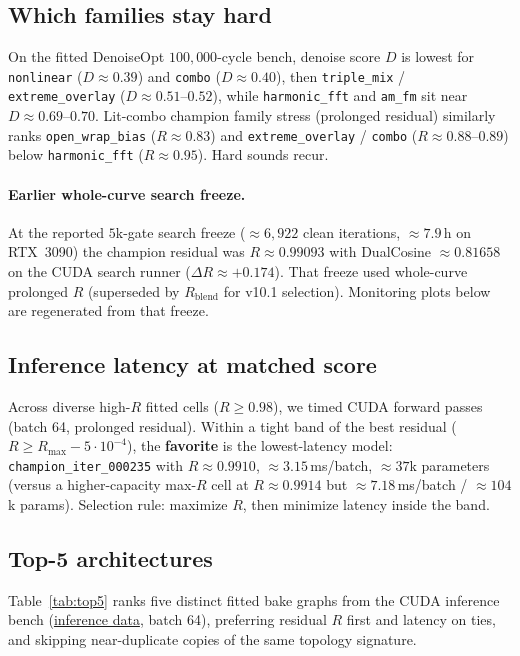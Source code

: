 \subsection{Which families stay hard}
\label{sec:family-hardness}
On the fitted DenoiseOpt $100{,}000$-cycle bench, denoise score $D$ is lowest for \texttt{nonlinear} ($D\approx 0.39$) and \texttt{combo} ($D\approx 0.40$), then \texttt{triple\_mix} / \texttt{extreme\_overlay} ($D\approx 0.51$--$0.52$), while \texttt{harmonic\_fft} and \texttt{am\_fm} sit near $D\approx 0.69$--$0.70$.
Lit-combo champion family stress (prolonged residual) similarly ranks \texttt{open\_wrap\_bias} ($R\approx 0.83$) and \texttt{extreme\_overlay} / \texttt{combo} ($R\approx 0.88$--$0.89$) below \texttt{harmonic\_fft} ($R\approx 0.95$).
Hard sounds recur.

\paragraph{Earlier whole-curve search freeze.}
At the reported $5$k-gate search freeze ($\approx 6{,}922$ clean iterations, $\approx 7.9$\,h on RTX~3090) the champion residual was $R\approx 0.99093$ with DualCosine $\approx 0.81658$ on the CUDA search runner ($\Delta R\approx{+}0.174$).
That freeze used whole-curve prolonged $R$ (superseded by $R_{\mathrm{blend}}$ for v10.1 selection).
Monitoring plots below are regenerated from that freeze.

\subsection{Inference latency at matched score}
\label{sec:inference-latency}
Across diverse high-$R$ fitted cells ($R\ge 0.98$), we timed CUDA forward passes (batch 64, prolonged residual).
Within a tight band of the best residual ($R \ge R_{\max}-5\cdot10^{-4}$), the \textbf{favorite} is the lowest-latency model:
\texttt{champion\_iter\_000235} with $R\approx 0.9910$, $\approx 3.15$\,ms/batch, $\approx 37$k parameters
(versus a higher-capacity max-$R$ cell at $R\approx 0.9914$ but $\approx 7.18$\,ms/batch / $\approx 104$k params).
Selection rule: maximize $R$, then minimize latency inside the band.

\subsection{Top-5 architectures}
\label{sec:top5-arch}
Table~\ref{tab:top5} ranks five distinct fitted bake graphs from the CUDA inference bench
(\href{https://github.com/reeldemo/denoise-opt-meta/blob/master/paper/Unsupervised_Wavetable_Seam_Artifact_Repair_via_Hybrid_GA-PPO_Meta-Search_v10/figures/inference_bench.json}{inference data}, batch 64), preferring residual $R$ first and latency on ties,
and skipping near-duplicate copies of the same topology signature.

